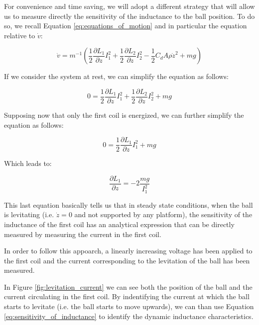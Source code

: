 For convenience and time saving, we will adopt a different strategy that will allow us to measure directly the sensitivity of the inductance to the ball position.
To do so, we recall Equation \ref{eq:equations_of_motion} and in particular the equation relative to $\dot{v}$:

\begin{equation}
    \dot{v} = m^{-1} \left(\frac{1}{2} \frac{\partial L_1}{\partial z} I_1^2 + \frac{1}{2} \frac{\partial L_2}{\partial z} I_2^2 - \frac{1}{2} C_d A \rho \dot{z}^2 + m g  \right)
\end{equation}

If we consider the system at rest, we can simplify the equation as follows:

\begin{equation}
    0 = \frac{1}{2} \frac{\partial L_1}{\partial z} I_1^2 + \frac{1}{2} \frac{\partial L_2}{\partial z} I_2^2 + m g
\end{equation}

Supposing now that only the first coil is energized, we can further simplify the equation as follows:

\begin{equation}
    0 = \frac{1}{2} \frac{\partial L_1}{\partial z} I_1^2 + m g
\end{equation}

Which leads to:

\begin{equation}
    \frac{\partial L_1}{\partial z} = -2 \frac{m g}{I_1^2}
    \label{eq:sensitivity_of_inductance}
\end{equation}

This last equation basically tells us that in steady state conditions, when the ball is levitating (i.e. $\dot{z} = 0$ and not supported by any platform), the sensitivity of the inductance of the first coil has an analytical expression that can be directly measured by measuring the current in the first coil.

In order to follow this appoarch, a linearly increasing voltage has been applied to the first coil and the current corresponding to the levitation of the ball has been measured.

In Figure \ref{fig:levitation_current} we can see both the position of the ball and the current circulating in the first coil.
By indentifying the current at which the ball starts to levitate (i.e. the ball starts to move upwards), we can than use Equation \ref{eq:sensitivity_of_inductance} to identify the dynamic inductance characteristics.

